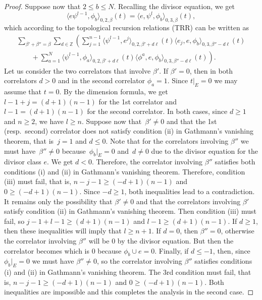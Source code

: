 \documentclass[10pt,a4paper]{article}
\numberwithin{equation}{section}
\newcommand{\ZZ}{\mathbb{Z}}
\begin{document}
\begin{proof}
Suppose now that $2\leq b\leq N$. Recalling the divisor equation, we get
\[
\big\langle e\psi^{l-1},\phi_b\big\rangle_{0,2,\beta}(t) =
\big\langle e,\psi^{l},\phi_b\big\rangle_{0,3,\beta}(t),
\]
which according to the topological recursion relations (TRR) can be written as
\begin{gather*}
\sum_{\beta'+\beta''=\beta} \sum_{d\in \ZZ} \left(
\sum_{j=1}^{n-1}
\big\langle \psi^{l-1},e^j\big\rangle_{0,2,\beta'+d\ell}(t)
\langle e_j, e,\phi_b\rangle_{0,3,\beta''-d\ell}(t)\right. \\
\left.\qquad+
\sum_{a=1}^{N}
\big\langle \psi^{l-1},\phi_a\big\rangle_{0,2,\beta'+d\ell}(t)
\langle \phi^a, e,\phi_b\rangle_{0,3,\beta''-d\ell}(t)
\right).
\end{gather*}
Let us consider the two correlators that involve $\beta'$. If
$\beta'=0$, then in both correlators $d>0$ and in the second
correlator $\phi_a=1$. Since $t|_E=0$ we may assume that $t=0$. By the
dimension formula, we get $l-1+j=(d+1)(n-1)$ for the 1st correlator and
$l-1=(d+1)(n-1)$ for the second correlator. In both cases, since
$d\geq 1$ and $n\geq 2$, we have $l\geq n$. Suppose now that~$\beta'\neq 0$ and that the 1st (resp.\ second) correlator does not
satisfy condition (ii) in Gathmann's vanishing theorem, that is~$j=1$
and $d\leq 0$. Note that for the correlators involving $\beta''$ we
must have~$\beta''\neq 0$ because~${\phi_b}|_{E}=0$ and~$d\neq 0$ due
to the divisor equation for the divisor class $e$. We get $d<0$. Therefore, the correlator involving $\beta''$ satisfies both conditions (i) and (ii) in Gathmann's vanishing theorem. Therefore, condition (iii) must fail, that is, $n-j-1\geq (-d+1)(n-1)$ and $0\geq (-d+1)(n-1)$. Since $-d\geq 1$, both inequalities lead to a contradiction. It remains only the possibility that $\beta'\neq 0$ and that the correlators involving $\beta'$ satisfy condition (ii) in Gathmann's vanishing theorem. Then condition (iii) must fail, so
$j-1+l-1\geq (d+1)(n-1)$ and $l-1\geq (d+1)(n-1)$. If $d\geq 1$, then these inequalities will imply that $l\geq n+1$. If $d=0$, then $\beta''=0$, otherwise the correlator involving $\beta''$ will be $0$ by the divisor equation. But then the correlator becomes  which is $0$ because $\phi_b\cup e=0$. Finally, if $d\leq -1$, then, since $\phi_b|_{E}=0$ we must have $\beta''\neq 0$, so the correlator involving $\beta''$ satisfies conditions (i) and (ii) in Gathmann's vanishing theorem. The 3rd condition must fail, that is, $n-j-1\geq (-d+1)(n-1)$ and $0\geq (-d+1)(n-1)$. Both inequalities are impossible and this completes the analysis in the second case.


\end{proof}
\end{document}

